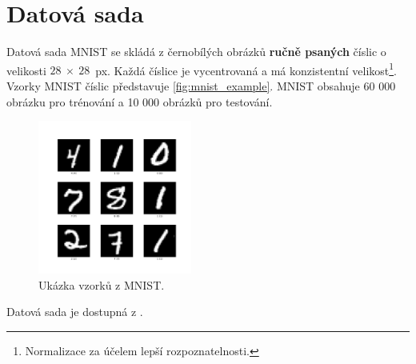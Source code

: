 \newpage
\section{Datová sada}
\label{sec:mnist}
Datová sada MNIST se skládá z černobílých obrázků \textbf{ručně psaných} číslic o velikosti $28~\times~28$~px.
Každá číslice je vycentrovaná a má konzistentní velikost\footnote{Normalizace za účelem lepší rozpoznatelnosti.}.
Vzorky MNIST číslic představuje \autoref{fig:mnist_example}.
MNIST obsahuje 60 000 obrázku pro trénování a 10 000 obrázků pro testování.

\begin{figure}[H]
    \centering
    \includegraphics[width=0.45\textwidth]{figures/mnist_example.png}
    \caption{Ukázka vzorků z MNIST.}
    \label{fig:mnist_example}
\end{figure}

Datová sada je dostupná z \textcite{LeCun2010}.
